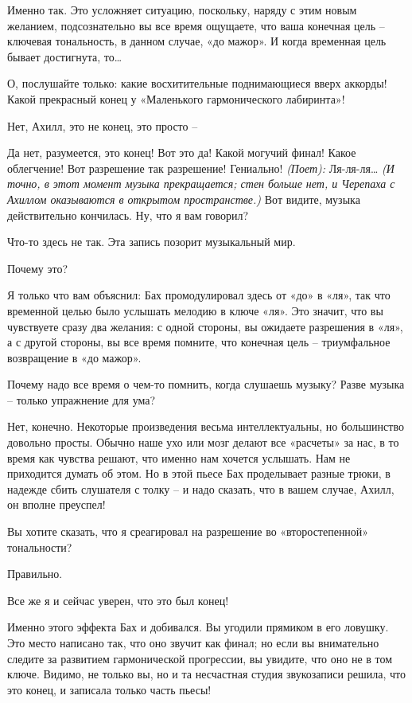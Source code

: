 \documentclass[../main.tex]{subfiles}
\begin{document}
\begin{Dialogue}
\begin{sublevel}
\begin{sublevel}
\begin{sublevel}
 Именно так. Это усложняет ситуацию, поскольку, наряду с этим новым желанием, подсознательно вы все время ощущаете, что ваша конечная цель \--- ключевая тональность, в данном случае, «до мажор». И когда временная цель бывает достигнута, то\ldots{}

 О, послушайте только: какие восхитительные поднимающиеся вверх аккорды! Какой прекрасный конец у «Маленького гармонического лабиринта»!

 Нет, Ахилл, это не конец, это просто \---

 Да нет, разумеется, это конец! Вот это да! Какой могучий финал! Какое облегчение! Вот разрешение так разрешение! Гениально! \emph{(Поет):} Ля-ля-ля\ldots{} \emph{(И точно, в этот момент музыка прекращается; стен больше нет, и Черепаха с Ахиллом оказываются в открытом пространстве.)} Вот видите, музыка действительно кончилась. Ну, что я вам говорил?

 Что-то здесь не так. Эта запись позорит музыкальный мир.

 Почему это?

 Я только что вам объяснил: Бах промодулировал здесь от «до» в «ля», так что временной целью было услышать мелодию в ключе «ля». Это значит, что вы чувствуете сразу два желания: с одной стороны, вы ожидаете разрешения в «ля», а с другой стороны, вы все время помните, что конечная цель \--- триумфальное возвращение в «до мажор».

 Почему надо все время о чем-то помнить, когда слушаешь музыку? Разве музыка \--- только упражнение для ума?

 Нет, конечно. Некоторые произведения весьма интеллектуальны, но большинство довольно просты. Обычно наше ухо или мозг делают все «расчеты» за нас, в то время как чувства решают, что именно нам хочется услышать. Нам не приходится думать об этом. Но в этой пьесе Бах проделывает разные трюки, в надежде сбить слушателя с толку \--- и надо сказать, что в вашем случае, Ахилл, он вполне преуспел!

 Вы хотите сказать, что я среагировал на разрешение во «второстепенной» тональности?

 Правильно.

 Все же я и сейчас уверен, что это был конец!

 Именно этого эффекта Бах и добивался. Вы угодили прямиком в его ловушку. Это место написано так, что оно звучит как финал; но если вы внимательно следите за развитием гармонической прогрессии, вы увидите, что оно не в том ключе. Видимо, не только вы, но и та несчастная студия звукозаписи решила, что это конец, и записала только часть пьесы!


\end{sublevel}
\end{sublevel}
\end{sublevel}
\end{Dialogue}
\end{document}
